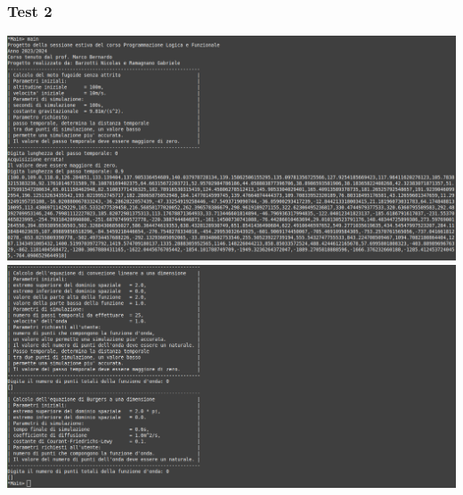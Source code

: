 \subsubsection*{Test 2}
\includegraphics[width=\textwidth,height=\textheight,keepaspectratio]{05_testing/image/hs/02_test/01_zero.png}
\\
\includegraphics[width=\textwidth,height=\textheight,keepaspectratio]{05_testing/image/hs/02_test/03_zero.png}



